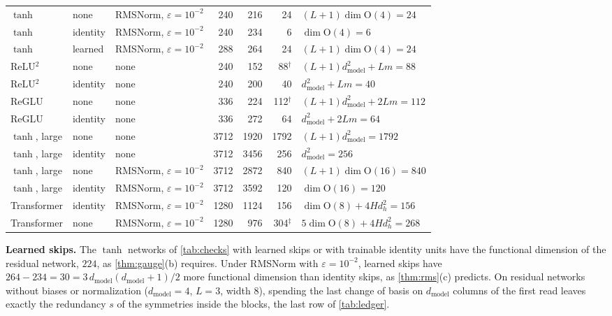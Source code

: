 \documentclass[10pt]{article}
\theoremstyle{definition}
\theoremstyle{remark}
\newcommand{\dm}{d_{\mathrm{model}}}
\newcommand{\Ort}{\mathrm{O}}
\newcommand{\para}[1]{\smallskip\noindent\textbf{#1}\hspace{0.5em}}
\begin{document}
\begin{table}[ht]
\begin{tabular}{@{}lllrrrl@{}}
$\tanh$ & none & RMSNorm, $\varepsilon = 10^{-2}$ & 240 & 216 & 24 & $(L{+}1)\dim\Ort(4) = 24$ \\
$\tanh$ & identity & RMSNorm, $\varepsilon = 10^{-2}$ & 240 & 234 & 6 & $\dim\Ort(4) = 6$ \\
$\tanh$ & learned & RMSNorm, $\varepsilon = 10^{-2}$ & 288 & 264 & 24 & $(L{+}1)\dim\Ort(4) = 24$ \\
\addlinespace
ReLU$^2$ & none & none & 240 & 152 & 88$^\dagger$ & $(L{+}1)\dm^2 + Lm = 88$ \\
ReLU$^2$ & identity & none & 240 & 200 & 40 & $\dm^2 + Lm = 40$ \\
ReGLU & none & none & 336 & 224 & 112$^\dagger$ & $(L{+}1)\dm^2 + 2Lm = 112$ \\
ReGLU & identity & none & 336 & 272 & 64 & $\dm^2 + 2Lm = 64$ \\
\addlinespace
$\tanh$, large & none & none & 3712 & 1920 & 1792 & $(L{+}1)\dm^2 = 1792$ \\
$\tanh$, large & identity & none & 3712 & 3456 & 256 & $\dm^2 = 256$ \\
$\tanh$, large & none & RMSNorm, $\varepsilon = 10^{-2}$ & 3712 & 2872 & 840 & $(L{+}1)\dim\Ort(16) = 840$ \\
$\tanh$, large & identity & RMSNorm, $\varepsilon = 10^{-2}$ & 3712 & 3592 & 120 & $\dim\Ort(16) = 120$ \\
\addlinespace
Transformer & identity & RMSNorm, $\varepsilon = 10^{-2}$ & 1280 & 1124 & 156 & $\dim\Ort(8) + 4Hd_h^2 = 156$ \\
Transformer & none & RMSNorm, $\varepsilon = 10^{-2}$ & 1280 & 976 & 304$^\ddagger$ & $5\dim\Ort(8) + 4Hd_h^2 = 268$ \\
\bottomrule
\end{tabular}
\end{table}

\para{Learned skips.} The $\tanh$ networks of \cref{tab:checks} with learned skips or with trainable identity units have the functional dimension of the residual network, $224$, as \cref{thm:gauge}(b) requires. Under RMSNorm with $\varepsilon = 10^{-2}$, learned skips have $264 - 234 = 30 = 3\,\dm(\dm+1)/2$ more functional dimension than identity skips, as \cref{thm:rms}(c) predicts. On residual networks without biases or normalization ($\dm = 4$, $L = 3$, width $8$), spending the last change of basis on $\dm$ columns of the first read leaves exactly the redundancy $s$ of the symmetries inside the blocks, the last row of \cref{tab:ledger}.
\end{document}
